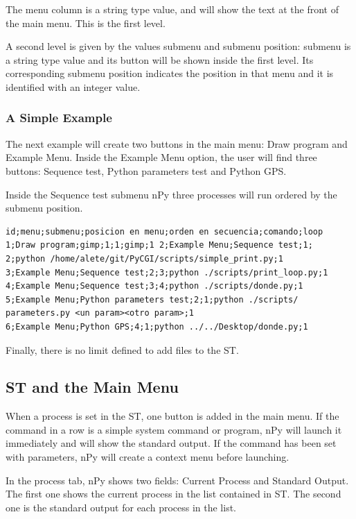 \documentclass[a4paper,10pt]{article}
\begin{document}
The menu column is a string type value, and will show the text at the front of the main menu. This is the first level.

A second level is given by the values submenu and submenu position: submenu is a string type value and its button will be shown inside the first level. Its corresponding submenu position indicates the position in that menu and it is identified with an integer value.

\subsubsection{A Simple Example}

The next example will create two buttons in the main menu: Draw program and Example Menu. Inside the Example Menu option, the user will find three buttons: Sequence test, Python parameters test and Python GPS.

Inside the Sequence test submenu nPy three processes will run ordered by the submenu position.

\begin{verbatim}
id;menu;submenu;posicion en menu;orden en secuencia;comando;loop 
1;Draw program;gimp;1;1;gimp;1 2;Example Menu;Sequence test;1;
2;python /home/alete/git/PyCGI/scripts/simple_print.py;1 
3;Example Menu;Sequence test;2;3;python ./scripts/print_loop.py;1 
4;Example Menu;Sequence test;3;4;python ./scripts/donde.py;1 
5;Example Menu;Python parameters test;2;1;python ./scripts/
parameters.py <un param><otro param>;1 
6;Example Menu;Python GPS;4;1;python ../../Desktop/donde.py;1
\end{verbatim}

\noindent Finally, there is no limit defined to add files to the ST.

\subsection{ST and the Main Menu}

When a process is set in the ST, one button is added in the main menu. If the command in a row is a simple system command or program, nPy will launch it immediately and will show the standard output. If the command has been set with parameters, nPy will create a context menu before launching.

In the process tab, nPy shows two fields: Current Process and Standard Output. The first one shows the current process in the list contained in ST. The second one is the standard output for each process in the list.
\end{document}
